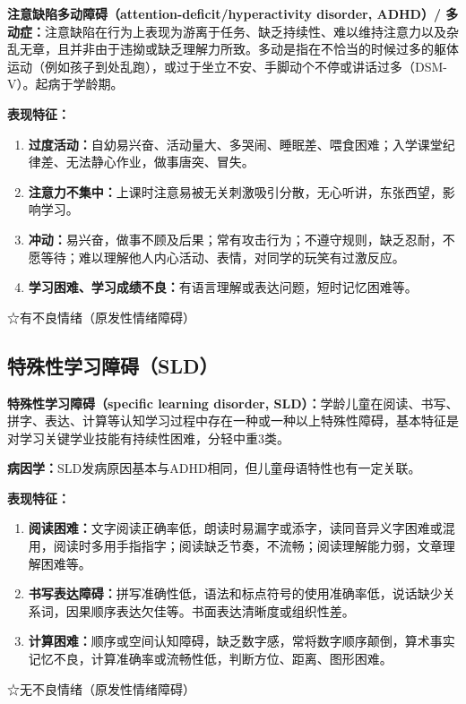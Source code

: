 \begin{keybox}
\textbf{注意缺陷多动障碍（attention-deficit/hyperactivity disorder, ADHD）/ 多动症：}注意缺陷在行为上表现为游离于任务、缺乏持续性、难以维持注意力以及杂乱无章，且并非由于违拗或缺乏理解力所致。多动是指在不恰当的时候过多的躯体运动（例如孩子到处乱跑），或过于坐立不安、手脚动个不停或讲话过多（DSM-V）。起病于学龄期。

\textbf{表现特征：}

\begin{enumerate}[leftmargin=*]
    \item \textbf{过度活动：}自幼易兴奋、活动量大、多哭闹、睡眠差、喂食困难；入学课堂纪律差、无法静心作业，做事唐突、冒失。
    \item \textbf{注意力不集中：}上课时注意易被无关刺激吸引分散，无心听讲，东张西望，影响学习。
    \item \textbf{冲动：}易兴奋，做事不顾及后果；常有攻击行为；不遵守规则，缺乏忍耐，不愿等待；难以理解他人内心活动、表情，对同学的玩笑有过激反应。
    \item \textbf{学习困难、学习成绩不良：}有语言理解或表达问题，短时记忆困难等。
\end{enumerate}

☆有不良情绪（原发性情绪障碍）
\end{keybox}

\subsection{特殊性学习障碍（SLD）}

\begin{keybox}
\textbf{特殊性学习障碍（specific learning disorder, SLD）：}学龄儿童在阅读、书写、拼字、表达、计算等认知学习过程中存在一种或一种以上特殊性障碍，基本特征是对学习关键学业技能有持续性困难，分轻中重3类。

\textbf{病因学：}SLD发病原因基本与ADHD相同，但儿童母语特性也有一定关联。

\textbf{表现特征：}

\begin{enumerate}[leftmargin=*]
    \item \textbf{阅读困难：}文字阅读正确率低，朗读时易漏字或添字，读同音异义字困难或混用，阅读时多用手指指字；阅读缺乏节奏，不流畅；阅读理解能力弱，文章理解困难等。
    \item \textbf{书写表达障碍：}拼写准确性低，语法和标点符号的使用准确率低，说话缺少关系词，因果顺序表达欠佳等。书面表达清晰度或组织性差。
    \item \textbf{计算困难：}顺序或空间认知障碍，缺乏数字感，常将数字顺序颠倒，算术事实记忆不良，计算准确率或流畅性低，判断方位、距离、图形困难。
\end{enumerate}

☆无不良情绪（原发性情绪障碍）
\end{keybox}

